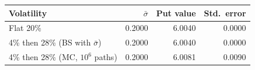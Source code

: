 \begin{tabular}{lrrr}
\toprule
Volatility & $\bar\sigma$ & Put value & Std.\ error \\
\midrule
Flat 20\% & 0.2000 & 6.0040 & 0.0000 \\
4\% then 28\% (BS with $\bar\sigma$) & 0.2000 & 6.0040 & 0.0000 \\
4\% then 28\% (MC, $10^6$ paths) & 0.2000 & 6.0081 & 0.0090 \\
\bottomrule
\end{tabular}
